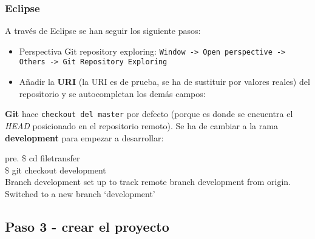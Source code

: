 \subsubsection{Eclipse}

A través de Eclipse se han seguir los siguiente pasos:

\begin{itemize}
\item
  Perspectiva Git repository exploring:
  \texttt{Window -\textgreater{} Open perspective -\textgreater{} Others -\textgreater{} Git Repository Exploring}
\item
  Añadir la \textbf{URI} (la URI es de prueba, se ha de sustituir por
  valores reales) del repositorio y se autocompletan los demás campos:
\end{itemize}
\textbf{Git} hace \texttt{checkout del master} por defecto (porque es
donde se encuentra el \emph{HEAD} posicionado en el repositorio remoto).
Se ha de cambiar a la rama \textbf{development} para empezar a
desarrollar:

pre. \$ cd filetransfer\\\$ git checkout development\\Branch development
set up to track remote branch development from origin.\\Switched to a
new branch `development'

\subsection{Paso 3 - crear el proyecto}

